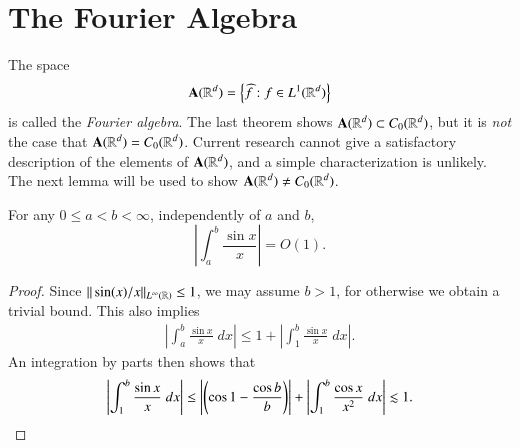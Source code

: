 %

\section{The Fourier Algebra}

The space
%
\[ \mathbf{A}(\operatorname{\mathbb{R}}^d) = \left\{ \widehat{f}: f \in L^1(\operatorname{\mathbb{R}}^d) \right\} \]
%
is called the \emph{Fourier algebra}. The last theorem shows $\mathbf{A}(\operatorname{\mathbb{R}}^d) \subset C_0(\operatorname{\mathbb{R}}^d)$, but it is {\it not} the case that $\mathbf{A}(\operatorname{\mathbb{R}}^d) = C_0(\operatorname{\mathbb{R}}^d)$. Current research cannot give a satisfactory description of the elements of $\mathbf{A}(\operatorname{\mathbb{R}}^d)$, and a simple characterization is unlikely. The next lemma will be used to show $\mathbf{A}(\operatorname{\mathbb{R}}^d) \neq C_0(\operatorname{\mathbb{R}}^d)$.

\begin{lemma}
    For any $0 \leq a < b < \infty$, independently of $a$ and $b$,
    \[ \left| \int_a^b \frac{\sin x}{x} \right| = O(1). \]
\end{lemma}
\begin{proof}
    Since $\| \sin(x)/x \|_{L^\infty(\operatorname{\mathbb{R}})} \leq 1$, we may assume $b > 1$, for otherwise we obtain a trivial bound. This also implies
    \begin{align*}
        \left| \int_a^b \frac{\sin x}{x}\; dx \right| \leq 1 + \left| \int_1^b \frac{\sin x}{x}\; dx \right|.
    \end{align*}
    An integration by parts then shows that
    \[ \left| \int_1^b \frac{\sin x}{x}\; dx \right| \leq \left| \left( \cos 1 - \frac{\cos b}{b} \right) \right| + \left| \int_1^b \frac{\cos x}{x^2}\; dx \right| \lesssim 1. \qedhere \]
\end{proof}

